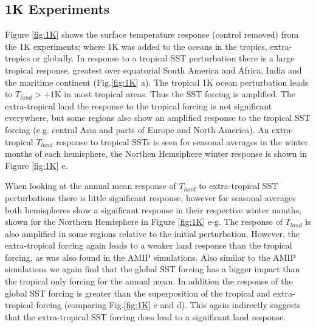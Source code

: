 \subsection{1K Experiments}

Figure \ref{fig:1K} shows the surface temperature response (control removed) 
from the 1K experiments; where 1K was added to the oceans in the tropics, 
extra-tropics or globally. In response to a tropical SST perturbation there is a 
large tropical response, greatest over equatorial South America and Africa, 
India and the maritime continent (Fig.\ref{fig:1K} a). The tropical 1K ocean 
perturbation leads to $T_{land}>+1$K in most tropical areas. Thus the SST 
forcing is amplified. The extra-tropical land the response to the tropical 
forcing is not significant everywhere, but some regions also show an amplified 
response to the tropical SST forcing (e.g. central Asia and parts of Europe and 
North America).  An extra-tropical $T_{land}$ response to tropical SSTs is seen 
for seasonal averages in the winter months of each hemisphere, the Northen 
Hemsiphere winter response is shown in Figure \ref{fig:1K} e.

When looking at the annual mean response of $T_{land}$ to extra-tropical SST 
perturbations there is little significant response, however for seasonal 
averages both hemispheres show a significant response in their respective winter 
months, shown for the Northern Hemisphere in Figure \ref{fig:1K} e-g. The 
response of $T_{land}$ is also amplified in some regions relative to the initial 
perturbation.  However, the extra-tropical forcing again leads to a weaker land 
response than the tropical forcing, as was also found in the AMIP simulations.  
Also similar to the AMIP simulations we again find that the  global SST forcing 
has a bigger impact than the tropical only forcing for the annual mean. In 
addition the response of the global SST forcing is greater than the 
superposition of the tropical and extra-tropical forcing (comparing 
Fig.\ref{fig:1K} c and d).  This again indirectly suggests that the 
extra-tropical SST forcing does lead to a significant land response.

